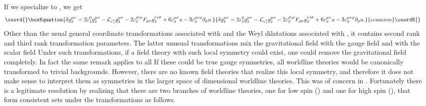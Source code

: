 \documentclass[a4paper,12pt]{article}
\begin{document}
If we specialize to \coordHE{}, we get
\begin{equation}\coord{}\boxEquation{
\delta g_{2}^{\mu \nu }=2\varepsilon _{1}^{0}g_{2}^{\mu \nu }-\mathcal{L}
_{\varepsilon _{1}^{1}}g_{2}^{\mu \nu }-2\varepsilon _{2}^{\rho (\mu
}F_{\rho \sigma }g_{2}^{\nu )\sigma }+6\varepsilon _{3}^{\mu \nu
}u-3\varepsilon _{3}^{\mu \nu \rho }\partial _{\rho }u.
}{
\delta g_{2}^{\mu \nu }=2\varepsilon _{1}^{0}g_{2}^{\mu \nu }-\mathcal{L}
_{\varepsilon _{1}^{1}}g_{2}^{\mu \nu }-2\varepsilon _{2}^{\rho (\mu
}F_{\rho \sigma }g_{2}^{\nu )\sigma }+6\varepsilon _{3}^{\mu \nu
}u-3\varepsilon _{3}^{\mu \nu \rho }\partial _{\rho }u.
}{ecuacion}\coordE{}\end{equation}
Other than the usual general coordinate transformations associated with \coordHE{} and the Weyl dilatations associated with \coordHE{}, it contains second rank \coordHE{} and third rank \coordHE{}
transformation parameters. The latter unusual transformations mix the
gravitational field with the gauge field \coordHE{} and with the
scalar field \coordHE{} Under such transformations, if a field theory with such
local symmetry could exist, one could remove the gravitational field
completely. In fact the same remark applies to all \coordHE{} If these could
be true gauge symmetries, all worldline theories would be canonically
transformed to trivial backgrounds. However, there are no known field
theories that realize this local symmetry, and therefore it does not make
sense to interpret them as symmetries in the larger space of \coordHE{} dimensional
worldline theories. This was of concern in \cite{segal}. Fortunately there
is a legitimate resolution by realizing that there are two branches of
worldline theories, one for low spin (\coordHE{}) and one for high spin (\coordHE{}), that form consistent sets under the transformations as follows.
\end{document}

